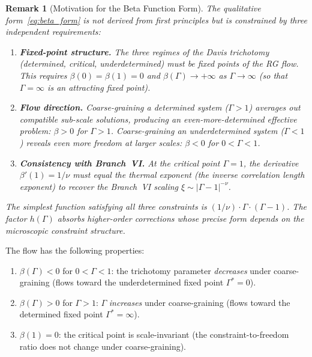 \documentclass[11pt,letterpaper]{article}
\newtheorem{remark}[conjecture]{Remark}
\begin{document}
\begin{remark}[Motivation for the Beta Function 
Form]\label{rem:beta_motivation}
The qualitative form~\eqref{eq:beta_form} is not derived from 
first principles but is constrained by three independent requirements:

\begin{enumerate}
    \item \textbf{Fixed-point structure.} The three regimes of the 
    Davis trichotomy (determined, critical, underdetermined) must be 
    fixed points of the RG flow. This requires $\beta(0) = \beta(1) 
    = 0$ and $\beta(\Gamma) \to +\infty$ as $\Gamma \to \infty$ 
    (so that $\Gamma = \infty$ is an attracting fixed point).
    
    \item \textbf{Flow direction.} Coarse-graining a determined 
    system ($\Gamma > 1$) averages out compatible sub-scale 
    solutions, producing an even-more-determined effective problem: 
    $\beta > 0$ for $\Gamma > 1$. Coarse-graining an underdetermined 
    system ($\Gamma < 1$) reveals even more freedom at larger scales: 
    $\beta < 0$ for $0 < \Gamma < 1$.
    
    \item \textbf{Consistency with Branch~VI.} At the critical point 
    $\Gamma = 1$, the derivative $\beta'(1) = 1/\nu$ must equal the 
    thermal exponent (the inverse correlation length exponent) to 
    recover the Branch~VI scaling $\xi \sim |\Gamma - 1|^{-\nu}$.
\end{enumerate}
The simplest function satisfying all three constraints is 
$(1/\nu) \cdot \Gamma \cdot (\Gamma - 1)$. The factor $h(\Gamma)$ 
absorbs higher-order corrections whose precise form depends on the 
microscopic constraint structure.
\end{remark}

The flow has the following properties:
\begin{enumerate}[label=(\alph*)]
    \item $\beta(\Gamma) < 0$ for $0 < \Gamma < 1$: the trichotomy 
    parameter \emph{decreases} under coarse-graining (flows toward 
    the underdetermined fixed point $\Gamma^* = 0$).
    
    \item $\beta(\Gamma) > 0$ for $\Gamma > 1$: $\Gamma$ 
    \emph{increases} under coarse-graining (flows toward the 
    determined fixed point $\Gamma^* = \infty$).
    
    \item $\beta(1) = 0$: the critical point is scale-invariant 
    (the constraint-to-freedom ratio does not change under 
    coarse-graining).
\end{enumerate}
\end{document}
